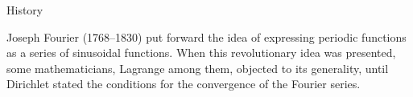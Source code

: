 \begin{EMjoin}

\begin{EMunit}


\end{EMunit}

\begin{EMproof}{}


\end{EMproof}

\end{EMjoin}

\begin{EMjoin}

\begin{EMunit}


\end{EMunit}

\begin{EMproof}{}


\end{EMproof}

\end{EMjoin}

\EMhold


\begin{EMremark}{History}

Joseph Fourier (1768--1830) put forward the idea of expressing periodic functions as a series of sinusoidal functions. When this revolutionary idea was presented, some mathematicians, Lagrange among them, objected to its generality, until Dirichlet stated the conditions for the convergence of the Fourier series.

\end{EMremark}

